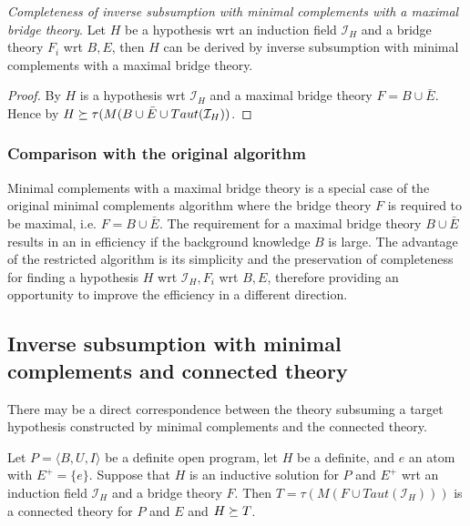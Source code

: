 \begin{proposition}
\label{completeness_of_inverse_subsumption_with_maximal_bridge_theory}
\emph{Completeness of inverse subsumption with minimal complements with a maximal bridge theory}.
Let $H$ be a hypothesis wrt an induction field $\mathcal{I}_H$ and a bridge theory $F_i$ wrt $B, E$, then $H$ can be derived by inverse subsumption with minimal complements with a maximal bridge theory.
\end{proposition}

\begin{proof}
By  $H$ is a hypothesis wrt $\mathcal{I}_H$ and a maximal bridge theory $F=B \cup \bar{E}$.
Hence by  $H \succeq \tau(M(B \cup \bar{E} \cup Taut(\mathcal{I}_H))$.
\end{proof}

\subsubsection{Comparison with the original algorithm}
Minimal complements with a maximal bridge theory is a special case of the original minimal complements algorithm where the bridge theory $F$ is required to be maximal, i.e. $F=B \cup \bar{E}$. The requirement for a maximal bridge theory $B \cup \bar{E}$ results in an in efficiency if the background knowledge $B$ is large. The advantage of the restricted algorithm is its simplicity and the preservation of completeness for finding a hypothesis $H$ wrt $\mathcal{I}_H, F_i$ wrt $B,E$, therefore providing an opportunity to improve the efficiency in a different direction.

\subsection{Inverse subsumption with minimal complements and connected theory}
There may be a direct correspondence between the theory subsuming a target hypothesis constructed by minimal complements and the connected theory.

\begin{conjecture}
Let $P=\langle B, U, I \rangle$ be a definite open program, let $H$ be a definite, and $e$ an atom with $E^+=\{e\}$. Suppose that $H$ is an inductive solution for $P$ and $E^+$ wrt an induction field $\mathcal{I}_H$ and a bridge theory $F$.
Then $T=\tau(M(F \cup Taut(\mathcal{I}_H)))$ is a connected theory for $P$ and $E$ and $H \succeq T$.
\end{conjecture}

